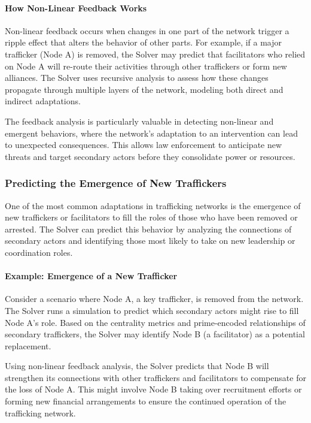 \documentclass[%
 preprint, linenumbers,
 amsmath,amssymb,
 aps, physrev,
]{revtex4-2}
\begin{document}
\paragraph{How Non-Linear Feedback Works}

Non-linear feedback occurs when changes in one part of the network trigger a ripple effect that alters the behavior of other parts. For example, if a major trafficker (Node A) is removed, the Solver may predict that facilitators who relied on Node A will re-route their activities through other traffickers or form new alliances. The Solver uses recursive analysis to assess how these changes propagate through multiple layers of the network, modeling both direct and indirect adaptations.

The feedback analysis is particularly valuable in detecting non-linear and emergent behaviors, where the network’s adaptation to an intervention can lead to unexpected consequences. This allows law enforcement to anticipate new threats and target secondary actors before they consolidate power or resources.

\subsubsection{Predicting the Emergence of New Traffickers}

One of the most common adaptations in trafficking networks is the emergence of new traffickers or facilitators to fill the roles of those who have been removed or arrested. The Solver can predict this behavior by analyzing the connections of secondary actors and identifying those most likely to take on new leadership or coordination roles.

\paragraph{Example: Emergence of a New Trafficker}

Consider a scenario where Node A, a key trafficker, is removed from the network. The Solver runs a simulation to predict which secondary actors might rise to fill Node A’s role. Based on the centrality metrics and prime-encoded relationships of secondary traffickers, the Solver may identify Node B (a facilitator) as a potential replacement.

Using non-linear feedback analysis, the Solver predicts that Node B will strengthen its connections with other traffickers and facilitators to compensate for the loss of Node A. This might involve Node B taking over recruitment efforts or forming new financial arrangements to ensure the continued operation of the trafficking network.
\end{document}
